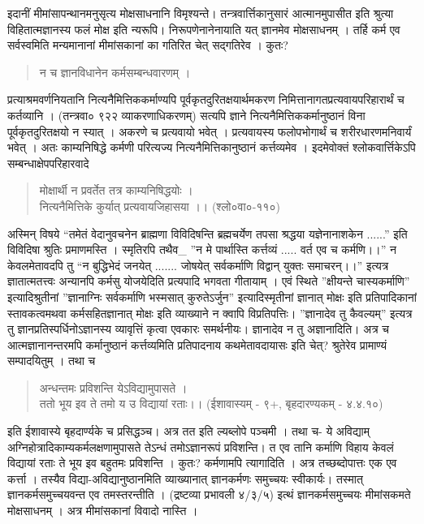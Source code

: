 इदानीं मीमांसापन्थानमनुसृत्य मोक्षसाधनानि विमृश्यन्ते। तन्त्रवार्त्तिकानुसारं आत्मानमुपासीत इति श्रुत्या विहितात्मज्ञानस्य फलं मोक्ष इति न्यरूपि। निरूपणेनानेनायाति यत् ज्ञानमेव मोक्षसाधनम् । तर्हि कर्म एव सर्वस्वमिति मन्यमानानां मीमांसकानां का गतिरित चेत्  सद्गतिरेव । कुतः?
\begin{verse}
न च ज्ञानविधानेन कर्मसम्बन्धवारणम् ।
\end{verse}
प्रत्याश्रमवर्णनियतानि नित्यनैमित्तिककर्माण्यपि पूर्वकृतदुरितक्षयार्थमकरण निमित्तानागतप्रत्यवायपरिहारार्थं च कर्तव्यानि । (तन्त्रवा० ९२२ व्याकरणाधिकरणम्) सत्यपि ज्ञाने नित्यनैमित्तिककर्मानुष्ठानं विना पूर्वकृतदुरितक्षयो न स्यात् । अकरणे च प्रत्यवायो भवेत् । प्रत्यवायस्य फलोपभोगार्थं च शरीरधारणमनिवार्यं भवेत् । अतः काम्यनिषिद्धे कर्मणी परित्यज्य नित्यनैमित्तिकानुष्ठानं कर्त्तव्यमेव । इदमेवोक्तं श्लोकवार्त्तिकेऽपि सम्बन्धाक्षेपपरिहारवादे
\begin{verse}
मोक्षार्थी न प्रवर्तेत तत्र काम्यनिषिद्धयोः  ।\\
नित्यनैमित्तिके कुर्यात् प्रत्यवायजिहासया ।। (श्लो०वा०-११०)
\end{verse}
अस्मिन् विषये “तमेतं वेदानुवचनेन ब्राह्मणा विविदिषन्ति ब्रह्मचर्येण तपसा श्रद्धया यज्ञेनानाशकेन ......” इति विविदिषा श्रुतिः प्रमाणमस्ति । स्मृतिरपि तथैव\_ ”न मे पार्थास्ति कर्त्तव्यं ..... वर्त एव च कर्मणि।।” न केवलमेतावदपि तु “न बुद्धिभेदं जनयेत् ....... जोषयेत् सर्वकर्माणि विद्वान् युक्तः समाचरन्।।” इत्यत्र ज्ञातात्मतत्त्वः अन्यानपि कर्मसु योजयेदिति प्रत्यपादि भगवता गीतायाम् । एवं स्थिते ”क्षीयन्ते चास्यकर्माणि” इत्यादिश्रुतीनां ”ज्ञानाग्निः सर्वकर्माणि भस्मसात् कुरुतेऽर्जुन” इत्यादिस्मृतीनां ज्ञानात् मोक्षः इति प्रतिपादिकानां स्तावकत्वमथवा कर्मसहितज्ञानात् मोक्षः इति व्याख्याने न क्वापि विप्रतिपत्तिः। ”ज्ञानादेव तु कैवल्यम्” इत्यत्र तु ज्ञानप्रतिस्पर्धिनोऽज्ञानस्य व्यावृत्तिं कृत्वा एवकारः समर्थनीयः। ज्ञानादेव न तु अज्ञानादिति। अत्र च आत्मज्ञानानन्तरमपि कर्मानुष्ठानं कर्त्तव्यमिति प्रतिपादनाय कथमेतावदायासः इति चेत्? श्रुतेरेव प्रामाण्यं सम्पादयितुम् । तथा च
\begin{verse}
अन्धन्तमः प्रविशन्ति येऽविद्यामुपासते ।\\
ततो भूय इव ते तमो य उ विद्यायां रताः।। (ईशावास्यम् - ९+, बृहदारण्यकम् - ४.४.१०)
\end{verse}
इति ईशावास्ये बृहदार्ण्यके च प्रसिद्धञ्च। अत्र तत इति ल्यब्लोपे पञ्चमी । तथा च- ये अविद्याम् अग्निहोत्रादिकाम्यकर्मलक्षणामुपासते तेऽन्धं तमोऽज्ञानरूपं प्रविशन्ति। त एव तानि कर्माणि विहाय केवलं विद्यायां रताः ते भूय इव बहुतमः प्रविशन्ति । कुतः? कर्मणामपि त्यागादिति । अत्र तच्छब्दोपात्तः एक एव कर्त्ता । तस्यैव विद्या-अविद्यानुष्ठानमिति व्याख्यानात् ज्ञानकर्मणः समुच्चयः स्वीकार्यः। तस्मात् ज्ञानकर्मसमुच्चयवन्त एव तमस्तरन्तीति । (द्रष्टव्या प्रभावली ४/३/५) इत्थं ज्ञानकर्मसमुच्चयः मीमांसकमते मोक्षसाधनम् । अत्र मीमांसकानां विवादो नास्ति ।

